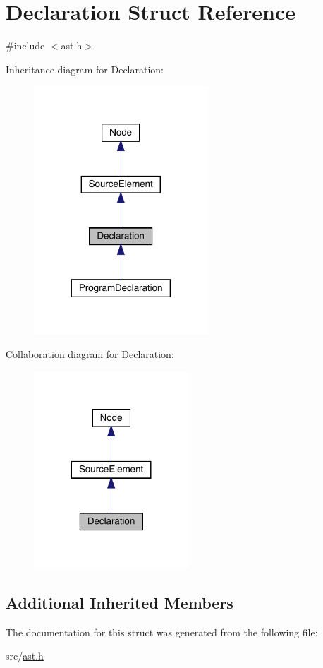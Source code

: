 \hypertarget{struct_declaration}{}\section{Declaration Struct Reference}
\label{struct_declaration}


{\ttfamily \#include $<$ast.\+h$>$}



Inheritance diagram for Declaration\+:
\nopagebreak
\begin{figure}[H]
\begin{center}
\leavevmode
\includegraphics[width=185pt]{struct_declaration__inherit__graph}
\end{center}
\end{figure}


Collaboration diagram for Declaration\+:
\nopagebreak
\begin{figure}[H]
\begin{center}
\leavevmode
\includegraphics[width=164pt]{struct_declaration__coll__graph}
\end{center}
\end{figure}
\subsection*{Additional Inherited Members}


The documentation for this struct was generated from the following file\+:\begin{DoxyCompactItemize}
\item 
src/\hyperlink{ast_8h}{ast.\+h}\end{DoxyCompactItemize}
